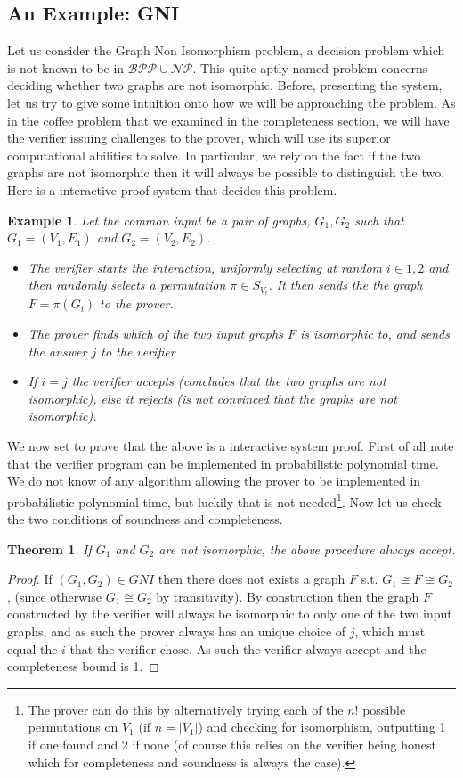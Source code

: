 \documentclass{article}
\newtheorem{theorem}{Theorem}
\newtheorem{example}{Example}
\begin{document}
\subsection{An Example: GNI}
Let us consider the Graph Non Isomorphism problem, a decision problem which is not known to be in $\mathcal{BPP} \cup \mathcal{NP}$. This quite aptly named problem concerns deciding whether two graphs are not isomorphic.
Before, presenting the system, let us try to give some intuition onto how we will be approaching the problem. As in the coffee problem that we examined in the completeness section, we will have the verifier issuing challenges to the prover, which will use its superior computational abilities to solve. In particular, we rely on the fact if the two graphs are not isomorphic then it will always be possible to distinguish the two. 
Here is a interactive proof system that decides this problem.
\begin{example}
Let the common input be a pair of graphs, $G_1, G_2$ such that $G_1 = (V_1, E_1)$ and $G_2 = (V_2, E_2)$.
\begin{itemize}
    
    \item The verifier starts the interaction, uniformly selecting at random $i \in {1, 2}$ and then randomly selects a permutation $\pi \in S_{V_i}$.
          It then sends the the graph $F = \pi(G_i)$ to the prover.
    \item The prover finds which of the two input graphs $F$ is isomorphic to, and sends the answer $j$ to the verifier
    \item If $i = j$ the verifier accepts (concludes that the two graphs are not isomorphic), else it rejects (is not convinced that the graphs are not isomorphic). 
\end{itemize}
\end{example}

We now set to prove that the above is a interactive system proof. First of all note that the verifier program can be implemented in probabilistic polynomial time. We do not know of any algorithm allowing the prover to be implemented in probabilistic polynomial time, but luckily that is not needed\footnote{The prover can do this by alternatively trying each of the $n!$ possible permutations on $V_1$ (if $n = |V_1|$) and checking for isomorphism, outputting 1 if one found and 2 if none (of course this relies on the verifier being honest which for completeness and soundness is always the case). }. Now let us check the two conditions of soundness and completeness. 
\begin{theorem}
If $G_1$ and $G_2$ are not isomorphic, the above procedure always accept. 
\end{theorem}
\begin{proof}
If $(G_1, G_2) \in GNI$ then there does not exists a graph $F$ s.t. $G_1 \cong F \cong G_2$, (since otherwise $G_1 \cong G_2$ by transitivity). By construction then the graph $F$ constructed by the verifier will always be isomorphic to only one of the two input graphs, and as such the prover always has an unique choice of $j$, which must equal the $i$ that the verifier chose. As such the verifier always accept and the completeness bound is 1. 
\end{proof}
\end{document}
